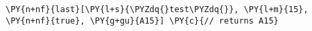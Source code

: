 \begin{Verbatim}[commandchars=\\\{\}]
\PY{n+nf}{last}[\PY{l+s}{\PYZdq{}test\PYZdq{}}, \PY{l+m}{15}, \PY{n+nf}{true}, \PY{g+gu}{A15}] \PY{c}{// returns A15}
\end{Verbatim}
